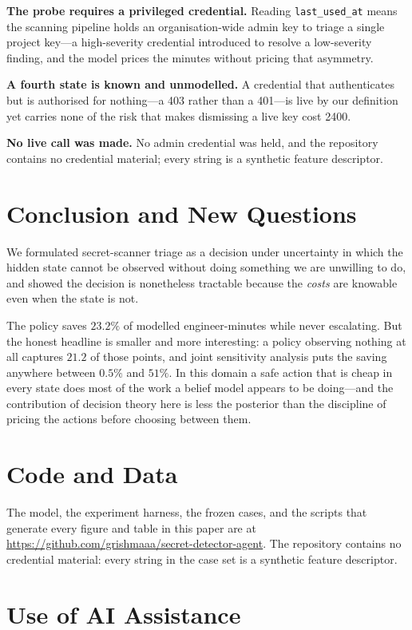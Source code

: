 \documentclass{article}
\begin{document}
\textbf{The probe requires a privileged credential.} Reading
\texttt{last\_used\_at} means the scanning pipeline holds an organisation-wide
admin key to triage a single project key---a high-severity credential introduced
to resolve a low-severity finding, and the model prices the minutes without
pricing that asymmetry.

\textbf{A fourth state is known and unmodelled.} A credential that authenticates
but is authorised for nothing---a 403 rather than a 401---is live by our
definition yet carries none of the risk that makes dismissing a live key cost
2400.

\textbf{No live call was made.} No admin credential was held, and the repository
contains no credential material; every string is a synthetic feature descriptor.

\section{Conclusion and New Questions}

We formulated secret-scanner triage as a decision under uncertainty in which the
hidden state cannot be observed without doing something we are unwilling to do,
and showed the decision is nonetheless tractable because the \emph{costs} are
knowable even when the state is not.

The policy saves $23.2\%$ of modelled engineer-minutes while never escalating.
But the honest headline is smaller and more interesting: a policy observing
nothing at all captures $21.2$ of those points, and joint sensitivity analysis
puts the saving anywhere between $0.5\%$ and $51\%$. In this domain a safe
action that is cheap in every state does most of the work a belief model appears
to be doing---and the contribution of decision theory here is less the posterior
than the discipline of pricing the actions before choosing between them.

\section*{Code and Data}

The model, the experiment harness, the frozen cases, and the scripts that
generate every figure and table in this paper are at
\url{https://github.com/grishmaaa/secret-detector-agent}. The repository
contains no credential material: every string in the case set is a synthetic
feature descriptor.

\section*{Use of AI Assistance}
\end{document}
